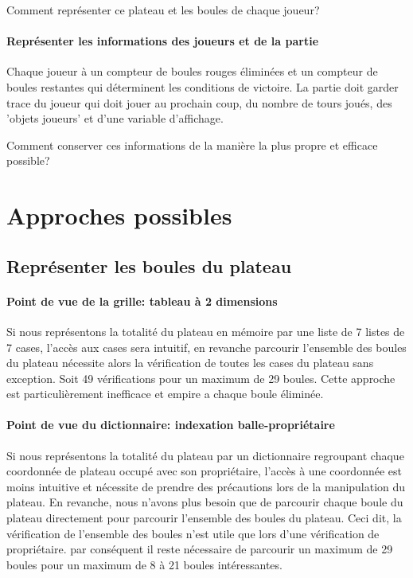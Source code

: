 \documentclass{scrreprt}
\begin{document}
			Comment représenter ce plateau et les boules de chaque joueur?
			
			\paragraph{Représenter les informations des joueurs et de la partie} 
			
			Chaque joueur à un compteur de boules rouges éliminées et un compteur de boules restantes qui déterminent les conditions de victoire. La partie doit garder trace du joueur qui doit jouer au prochain coup, du nombre de tours joués, des 'objets joueurs' et d'une variable d'affichage.
			
			Comment conserver ces informations de la manière la plus propre et efficace possible?
			
		
		\section{Approches possibles}
			\subsection{Représenter les boules du plateau}
				\paragraph{Point de vue de la grille: tableau à 2 dimensions} 
				
				Si nous représentons la totalité du plateau en mémoire par une liste de 7 listes de 7 cases, l'accès aux cases sera intuitif, en revanche parcourir l'ensemble des boules du plateau nécessite alors la vérification de toutes les cases du plateau sans exception. Soit 49 vérifications pour un maximum de 29 boules. Cette approche est particulièrement inefficace et empire a chaque boule éliminée.  
				
				\paragraph{Point de vue du dictionnaire: indexation balle-propriétaire} 
				
				Si nous représentons la totalité du plateau par un dictionnaire regroupant chaque coordonnée de plateau occupé avec son propriétaire, l'accès à une coordonnée est moins intuitive et nécessite de prendre des précautions lors de la manipulation du plateau. En revanche, nous n'avons plus besoin que de parcourir chaque boule du plateau directement pour parcourir l'ensemble des boules du plateau. Ceci dit, la vérification de l'ensemble des boules n'est utile que lors d'une vérification de propriétaire. par conséquent il reste nécessaire de parcourir un maximum de 29 boules pour un maximum de 8 à 21 boules intéressantes.
				
\end{document}
